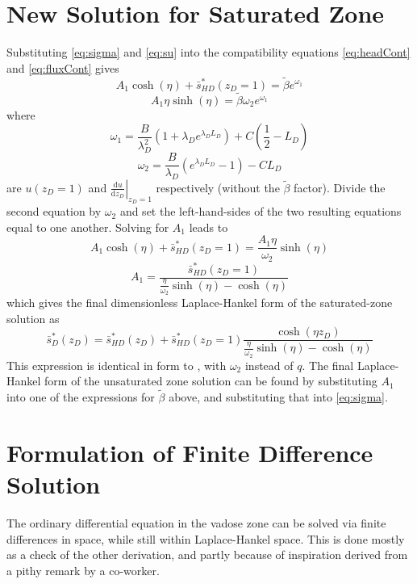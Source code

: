 \documentclass[12pt,letterpaper]{article}
\begin{document}
\section{New Solution for Saturated Zone}
Substituting \eqref{eq:sigma} and \eqref{eq:su} into the compatibility
equations \eqref{eq:headCont} and \eqref{eq:fluxCont} gives
\begin{equation}\nonumber
  A_1 \cosh(\eta) + \bar{s}_{HD}^{\ast}(z_D=1) = \tilde{\beta}e^{\omega_1}
\end{equation}
\begin{equation}\nonumber
 A_1 \eta  \sinh(\eta)  = \tilde{\beta} \omega_2 e^{\omega_1}
\end{equation}
where 
\begin{equation}\nonumber
 \omega_1 = \frac{B}{\lambda_D^2} \left( 1 + \lambda_D e^{\lambda_D
        L_D} \right) + C \left( \frac{1}{2}- L_D  \right) 
\end{equation}
\begin{equation}
  \label{eq:omega2}
  \omega_2 = \frac{B}{\lambda_D} \left( e^{\lambda_D L_D} -1 \right) - C L_D 
\end{equation}
are $u(z_D=1)$ and $\left. \frac{\mathrm{d} u}{\mathrm{d}z_D} \right|_{z_D=1}$
respectively (without the $\tilde\beta$ factor).
Divide the second equation by $\omega_2$ and set the left-hand-sides of the two resulting equations equal to one another.  Solving for $A_1$ leads to
\begin{equation}\nonumber
A_1 \cosh(\eta) + \bar{s}_{HD}^{\ast}(z_D=1) = \frac{A_1  \eta}{\omega_2}  \sinh(\eta) 
\end{equation}
\begin{equation}\nonumber
 A_1 = \frac{\bar{s}_{HD}^{\ast}(z_D=1)}{\frac{\eta}{\omega_2}  \sinh(\eta) - \cosh(\eta)}
\end{equation}
which gives the final dimensionless Laplace-Hankel form of the saturated-zone solution as
\begin{equation}\nonumber
 \bar{s}_D^{\ast}(z_D)  = \bar{s}_{HD}^{\ast}(z_D) + \bar{s}_{HD}^{\ast}(z_D=1) \frac{\cosh(\eta z_D)}{\frac{\eta}{\omega_2}  \sinh(\eta) - \cosh(\eta)}
\end{equation} 
This expression is identical in form to \cite[eqn.\ C17]{mishra10},
with $\omega_2$ instead of $q$.  The final Laplace-Hankel form of the
unsaturated zone solution can be found by substituting $A_1$ into one
of the expressions for $\tilde\beta$ above, and substituting that into
\eqref{eq:sigma}.

\section{Formulation of Finite Difference Solution}
The ordinary differential equation in the vadose zone can be solved
via finite differences in space, while still within Laplace-Hankel
space.  This is done mostly as a check of the other derivation, and
partly because of inspiration derived from a pithy remark by a co-worker.
\end{document}
